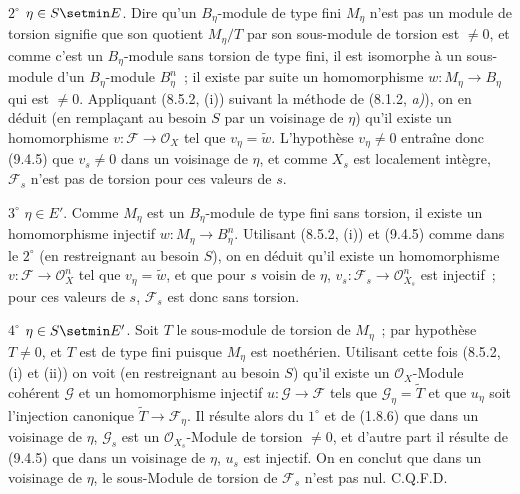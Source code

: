 $2^\circ$ $\eta\in S\setmin E$. Dire qu'un $B_\eta$-module de type fini $M_\eta$
n'est pas un module de torsion signifie que son quotient $M_\eta/T$ par son
sous-module de torsion est $\neq0$, et comme c'est un $B_\eta$-module sans
torsion de type fini, il est isomorphe à un sous-module d'un $B_\eta$-module
$B_\eta^n$~; il existe par suite un homomorphisme
$w:M_\eta\to B_\eta$ qui est $\neq0$. Appliquant (8.5.2, (i)) suivant la
méthode de (8.1.2, \emph{a)}), on en déduit (en remplaçant au besoin $S$ par un
voisinage de $\eta$) qu'il existe un homomorphisme
$v:\mathcal F\to\mathcal O_X$ tel que $v_\eta=\widetilde w$. L'hypothèse
$v_\eta\neq0$ entraîne donc (9.4.5) que $v_s\neq0$ dans un voisinage de
$\eta$, et comme $X_s$ est localement intègre, $\mathcal F_s$ n'est pas de
torsion pour ces valeurs de $s$.

$3^\circ$ $\eta\in E'$. Comme $M_\eta$ est un $B_\eta$-module de type fini
sans torsion, il existe un homomorphisme injectif
$w:M_\eta\to B_\eta^n$. Utilisant (8.5.2, (i)) et (9.4.5) comme dans le
$2^\circ$ (en restreignant au besoin $S$), on en déduit qu'il existe un
homomorphisme $v:\mathcal F\to\mathcal O_X^n$ tel que $v_\eta=\widetilde w$,
et que pour $s$ voisin de $\eta$,
$v_s:\mathcal F_s\to\mathcal O_{X_s}^n$ est injectif~; pour ces valeurs de
$s$, $\mathcal F_s$ est donc sans torsion.

$4^\circ$ $\eta\in S\setmin E'$. Soit $T$ le sous-module de torsion de $M_\eta$~;
par hypothèse $T\neq0$, et $T$ est de type fini puisque $M_\eta$ est
noethérien. Utilisant cette fois (8.5.2, (i) et (ii)) on voit (en restreignant
au besoin $S$) qu'il existe un $\mathcal O_X$-Module cohérent $\mathcal G$ et
un homomorphisme injectif $u:\mathcal G\to\mathcal F$ tels que
$\mathcal G_\eta=\widetilde T$ et que $u_\eta$ soit l'injection canonique
$\widetilde T\to\mathcal F_\eta$. Il résulte alors du $1^\circ$ et de (1.8.6)
que dans un voisinage de $\eta$, $\mathcal G_s$ est un
$\mathcal O_{X_s}$-Module de torsion $\neq0$, et d'autre part il résulte de
(9.4.5) que dans un voisinage de $\eta$, $u_s$ est injectif. On en conclut que
dans un voisinage de $\eta$, le sous-Module de torsion de $\mathcal F_s$ n'est
pas nul. C.Q.F.D.

